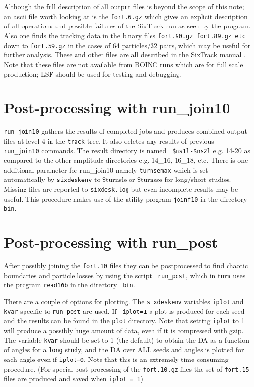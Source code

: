 \documentclass{cernatsnote}
\begin{document}
Although the full description of all output files is beyond the scope of this
note; an ascii file worth looking at is the \texttt{fort.6.gz} which gives an
explicit description of all operations and possible failures of the SixTrack
run as seen by the program. Also one finds the tracking data in the binary
files \texttt{fort.90.gz fort.89.gz etc} down to \texttt{fort.59.gz} in the cases of
64 particles/32 pairs, which may be useful for further analysis. These and
other files are all described in the SixTrack manual \cite{SixTrack}. Note that
these files are not available from BOINC runs which are for full scale
production; LSF should be used for testing and debugging. 

\section{Post-processing with run\_join10}
\texttt{run\_join10} gathers the results of completed jobs and produces combined
output files at level 4 in the \texttt{track} tree.  It also deletes any results
of previous \texttt{run\_join10} commands.  The result directory is named {\tt
\$ns1l-\$ns2l} e.g. 14-20 as compared to the
other amplitude directories e.g. 14\_16, 16\_18, etc.
There is one additional parameter for run\_join10 namely \texttt{turnsemax} which
is set automatically by \texttt{sixdeskenv} to \$turnsle or \$turnsse for
long/short studies. Missing files are reported to \texttt{sixdesk.log} but even
incomplete results may be useful. This procedure makes use of the utility
program \texttt{joinf10} in the directory \texttt{bin}.

\section{Post-processing with run\_post}
%
\label{sec:run_post}
After possibly joining the \texttt{fort.10} files they can be postprocessed to
find chaotic boundaries and particle losses by using the script {\tt
run\_post}, which in turn uses the program \texttt{read10b} in the directory {\tt
bin}.

There are a couple of options for plotting.  The  \texttt{sixdeskenv} variables
\texttt{iplot} and \texttt{kvar} specific to \texttt{run\_post} are used.  If {\tt
iplot=1} a plot is produced for each seed and the results can be found in the
\texttt{plot} directory. Note that setting \texttt{iplot} to 1 will produce a
possibly huge amount of data, even if it is compressed with gzip.  The variable
\texttt{kvar} should be set to 1 (the default) to obtain the DA as a function of
angles for a \texttt{long} study, and the DA over ALL seeds and angles is plotted
for each angle even if \texttt{iplot=0}. Note that this is an extremely time
consuming procedure. (For special post-processing of the \texttt{fort.10.gz} files
the set of \texttt{fort.15} files are produced and saved when \texttt{iplot = 1})
\end{document}
